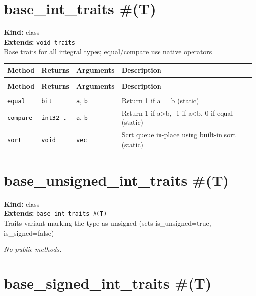 \documentclass[11pt,letterpaper]{report}
\begin{document}
\section{base\_int\_traits \#(T)}
\label{cls:baseinttraitsT}

\noindent\textbf{Kind:} class\\
\noindent\textbf{Extends:} \texttt{void\_traits}\\
\noindent Base traits for all integral types; equal/compare use native operators

\begin{xltabular}{\linewidth}{>{\small}p{1.35in} >{\small}p{1.25in} >{\small}p{0.95in} >{\small}X}
\toprule
\textbf{Method} & \textbf{Returns} & \textbf{Arguments} & \textbf{Description} \\
\midrule
\endfirsthead
{} \\
\midrule
\textbf{Method} & \textbf{Returns} & \textbf{Arguments} & \textbf{Description} \\
\midrule
\endhead
\midrule
{} \\
\endfoot
\bottomrule
\endlastfoot
\texttt{equal} & \texttt{bit} & \texttt{a}, \texttt{b} & Return 1 if a==b (static) \\
\texttt{compare} & \texttt{int32\_t} & \texttt{a}, \texttt{b} & Return 1 if a\textgreater{}b, -1 if a\textless{}b, 0 if equal (static) \\
\texttt{sort} & \texttt{void} & \texttt{vec} & Sort queue in-place using built-in sort (static) \\
\end{xltabular}

\section{base\_unsigned\_int\_traits \#(T)}
\label{cls:baseunsignedinttraitsT}

\noindent\textbf{Kind:} class\\
\noindent\textbf{Extends:} \texttt{base\_int\_traits \#(T)}\\
\noindent Traits variant marking the type as unsigned (sets is\_unsigned=true, is\_signed=false)

\noindent\textit{No public methods.}


\section{base\_signed\_int\_traits \#(T)}
\label{cls:basesignedinttraitsT}
\end{document}
